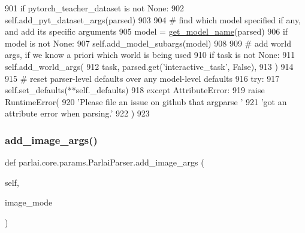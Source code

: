 \begin{DoxyCode}
901         \textcolor{keywordflow}{if} pytorch\_teacher\_dataset \textcolor{keywordflow}{is} \textcolor{keywordflow}{not} \textcolor{keywordtype}{None}:
902             self.add\_pyt\_dataset\_args(parsed)
903 
904         \textcolor{comment}{# find which model specified if any, and add its specific arguments}
905         model = \hyperlink{namespaceparlai_1_1core_1_1params_a6d160324f6af84562334fd0698141074}{get\_model\_name}(parsed)
906         \textcolor{keywordflow}{if} model \textcolor{keywordflow}{is} \textcolor{keywordflow}{not} \textcolor{keywordtype}{None}:
907             self.add\_model\_subargs(model)
908 
909         \textcolor{comment}{# add world args, if we know a priori which world is being used}
910         \textcolor{keywordflow}{if} task \textcolor{keywordflow}{is} \textcolor{keywordflow}{not} \textcolor{keywordtype}{None}:
911             self.add\_world\_args(
912                 task, parsed.get(\textcolor{stringliteral}{'interactive\_task'}, \textcolor{keyword}{False}),
913             )
914 
915         \textcolor{comment}{# reset parser-level defaults over any model-level defaults}
916         \textcolor{keywordflow}{try}:
917             self.set\_defaults(**self.\_defaults)
918         \textcolor{keywordflow}{except} AttributeError:
919             \textcolor{keywordflow}{raise} RuntimeError(
920                 \textcolor{stringliteral}{'Please file an issue on github that argparse '}
921                 \textcolor{stringliteral}{'got an attribute error when parsing.'}
922             )
923 
\end{DoxyCode}
\mbox{\label{classparlai_1_1core_1_1params_1_1ParlaiParser_a33d186a0cd665df88726b96f1bc3d88e}} 
\subsubsection{\texorpdfstring{add\+\_\+image\+\_\+args()}{add\_image\_args()}}
{\footnotesize\ttfamily def parlai.\+core.\+params.\+Parlai\+Parser.\+add\+\_\+image\+\_\+args (\begin{DoxyParamCaption}\item[{}]{self,  }\item[{}]{image\+\_\+mode }\end{DoxyParamCaption})}

